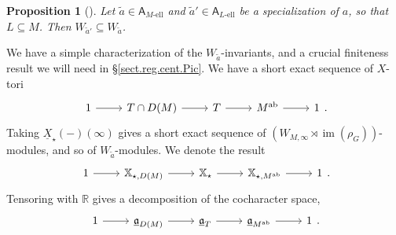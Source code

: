 \documentclass[openany]{amsbook}
\newtheorem{proposition}[theorem]{Proposition}
\theoremstyle{definition}
\theoremstyle{remark}
\numberwithin{equation}{section}
\newcommand{\R}{\mathbb{R}}
\newcommand{\im}{\operatorname{im}}
\newcommand{\ul}[1]{\underline{#1}}
\renewcommand{\-}{\operatorname{-}}
\renewcommand{\a}{\mathfrak{a}}
\newcommand{\wtilde}[1]{\widetilde{#1}}
\newcommand{\el}{\text{-ell}}
\newcommand{\bA}{\mathsf{A}}
\newcommand{\bX}{\mathbb{X}}
\newcommand{\bAe}[1]{\bA_{#1\el}}
\newcommand{\ab}{\mathrm{ab}}
\newcommand{\ga}{\ul{\a}}
\begin{document}
\begin{proposition}[{{\cite[Lemme 5.4.5]{ngofl}}}]\label{prop.monodr.inv.semicts}
    Let $\wtilde{a} \in \bAe{M}$ and $\wtilde{a}' \in \bAe{L}$ be a specialization of $a$, so that $L \subseteq M$. Then $W_{\wtilde{a}'} \subseteq W_{\wtilde{a}}$.
\end{proposition}


We have a simple characterization of the $W_{\wtilde{a}}$-invariants, and a crucial finiteness result we will need in \S \ref{sect.reg.cent.Pic}. We have a short exact sequence of $X$-tori 
$$
    \begin{tikzcd}[ampersand replacement=\&]
        1 \ar[r] \& T \cap D(M) \ar[r] \& T \ar[r] \& M^{\ab} \ar[r] \& 1
    \end{tikzcd}.
$$
Taking $\ul{X}_\star(-)(\infty)$ gives a short exact sequence of $(W_{M,\infty} \rtimes \im(\rho_G))$-modules, and so of $W_{\wtilde{a}}$-modules. We denote the result
$$
    \begin{tikzcd}[ampersand replacement=\&]
        1 \ar[r] \& \bX_{\star, D(M)} \ar[r] \& \bX_\star \ar[r] \& \bX_{\star, M^{\ab}} \ar[r] \& 1
    \end{tikzcd}.
$$
Tensoring with $\R$ gives a decomposition of the cocharacter space,
$$
    \begin{tikzcd}[ampersand replacement=\&]
        1 \ar[r] \& \ga_{D(M)} \ar[r] \& \ga_T \ar[r] \& \ga_{M^{\ab}} \ar[r] \& 1
    \end{tikzcd}.
$$
\end{document}
